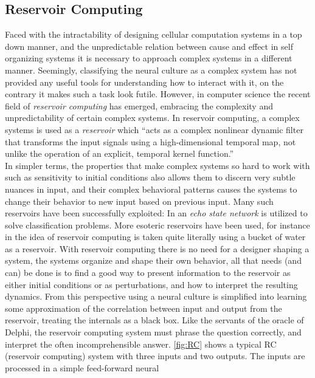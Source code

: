 \subsection{Reservoir Computing}
Faced with the intractability of designing cellular computation systems in a top
down manner, and the unpredictable relation between cause and effect in self organizing
systems it is necessary to approach complex systems in a different manner.
Seemingly, classifying the neural culture as a complex system has not provided
any useful tools for understanding how to interact with it, on the contrary it
makes such a task look futile.
However, in computer science the recent field of \textit{reservoir computing}
has emerged, embracing the complexity and unpredictability of certain complex
systems.
In reservoir computing, a complex systems is used as a \textit{reservoir}
\cite{schrauwen_overview_2007} which
``acts as a complex nonlinear dynamic filter that transforms the
input signals using a high-dimensional temporal map, not unlike the operation
of an explicit, temporal kernel function.''\\
In simpler terms, the properties that make complex systems so hard to work with
such as sensitivity to initial conditions also allows them to discern very
subtle nuances in input, and their complex behavioral patterns causes the
systems to change their behavior to new input based on previous input.
Many such reservoirs have been successfully exploited:
In \cite{jaeger_adaptive_2003} an \textit{echo state network} 
is utilized to solve classification problems.
More esoteric reservoirs have been used, for instance in
\cite{natschlager_liquid_2002} the idea of reservoir computing is taken quite
literally using a bucket of water as a reservoir.
With reservoir computing there is no need for a designer shaping a system, the
systems organize and shape their own behavior, all that needs (and can) be done
is to find a good way to present information to the reservoir as either initial
conditions or as perturbations, and how to interpret the resulting dynamics.
From this perspective using a neural culture is simplified into
learning some approximation of the correlation between input and output from the
reservoir, treating the internals as a black box.
Like the servants of the oracle of Delphi, the reservoir computing system must
phrase the question correctly, and interpret the often incomprehensible answer.
\ref{fig:RC} shows a typical RC (reservoir computing) system with three inputs
and two outputs. The inputs are processed in a simple feed-forward neural
